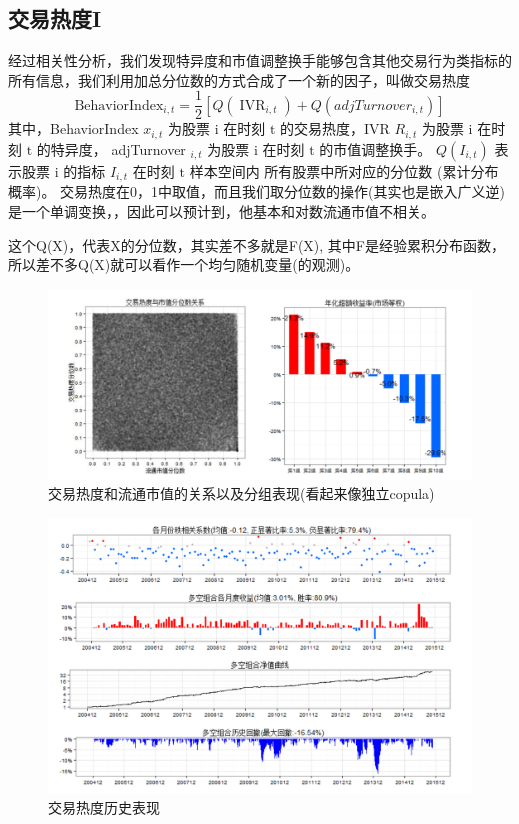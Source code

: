 \documentclass[12pt]{article}
\theoremstyle{definition}
\begin{document}
\subsection{交易热度I}
经过相关性分析，我们发现特异度和市值调整换手能够包含其他交易行为类指标的所有信息，我们利用加总分位数的方式合成了一个新的因子，叫做交易热度
$$ 
\text{BehaviorIndex}_{i, t}=\frac{1}{2}\left[Q\left(\operatorname{IVR}_{i, t}\right)+Q\left( adjTurnover_{i, t}\right)\right]
$$
其中，BehaviorIndex $x_{i, t}$ 为股票 $\mathrm{i}$ 在时刻 $\mathrm{t}$ 的交易热度，IVR $R_{i, t}$ 为股票 $\mathrm{i}$ 在时刻 $\mathrm{t}$ 的特异度， adjTurnover $_{i, t}$ 为股票 $\mathrm{i}$ 在时刻 $\mathrm{t}$ 的市值调整换手。 $Q\left(I_{i, t}\right)$ 表示股票 $\mathrm{i}$ 的指标 $I_{i, t}$ 在时刻 $\mathrm{t}$ 样本空间内 所有股票中所对应的分位数 (累计分布概率)。
交易热度在0，1中取值，而且我们取分位数的操作(其实也是嵌入广义逆)是一个单调变换，，因此可以预计到，他基本和对数流通市值不相关。
\begin{sremark}{}{}
这个Q(X)，代表X的分位数，其实差不多就是F(X), 其中F是经验累积分布函数，所以差不多Q(X)就可以看作一个均匀随机变量(的观测)。	
\end{sremark}
\begin{figure}[htb]
	\centering
	\includegraphics[scale=0.5]{figure/交易热度1.pic.jpg}
	\caption{交易热度和流通市值的关系以及分组表现(看起来像独立copula)}
\end{figure}

\begin{figure}[htb]
	\centering
	\includegraphics[scale=0.5]{figure/交易热度1历史表现.png}
	\caption{交易热度历史表现}
\end{figure}
\end{document}
